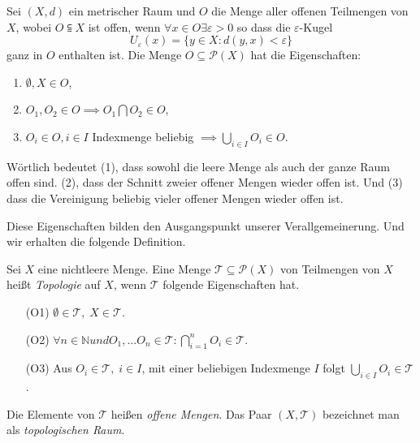 {
    Sei $(X,d)$ ein metrischer Raum und $O$ die Menge aller offenen Teilmengen von $X$,
    wobei $O \subseteqq X$ ist offen, wenn $\forall x \in O \exists \varepsilon > 0$ so dass die $\varepsilon$-Kugel
    $$
        U_\varepsilon(x) = \{ y \in X : d(y,x) < \varepsilon \}
    $$
    ganz in $O$ enthalten ist. 
    Die Menge $O \subseteq \mathcal{P}(X)$ hat die Eigenschaften:
    \begin{enumerate}
        \item $\emptyset, X \in O$,
        \item $O_1, O_2 \in O \implies O_1 \bigcap O_2 \in O$,
        \item $O_i \in O, i \in I$ Indexmenge beliebig $\implies \bigcup_{i \in I} O_i \in O$.
    \end{enumerate}
    Wörtlich bedeutet (1), dass sowohl die leere Menge als auch der ganze Raum
    offen sind. (2), dass der Schnitt zweier offener Mengen wieder offen ist.
    Und (3) dass die Vereinigung beliebig vieler offener Mengen wieder offen ist.
}

Diese Eigenschaften bilden den Ausgangspunkt unserer Verallgemeinerung. Und wir erhalten die folgende Definition.


{
    Sei $X$ eine nichtleere Menge. Eine Menge $\mathcal{T} \subseteq \mathcal{P}(X)$ von Teilmengen 
von $X$ heißt \emph{Topologie} auf $X$, wenn $\mathcal{T}$ folgende Eigenschaften hat.
\begin{itemize}
    \item[(O1)] $\emptyset \in \mathcal{T}, \; X \in \mathcal{T}$.
    \item[(O2)] $\forall n \in \mathbb{N} und O_1, \dots O_n \in \mathcal{T} : 
     \bigcap_{i=1}^{n} O_i \in \mathcal{T}$.
    \item[(O3)] Aus $O_i \in \mathcal{T}, \; i \in I$, mit einer beliebigen Indexmenge $I$ folgt 
    $\bigcup_{i \in I} O_i \in \mathcal{T}$.
\end{itemize}
Die Elemente von $\mathcal{T}$ heißen \emph{offene Mengen}. Das Paar $(X, \mathcal{T})$ 
bezeichnet man als \emph{topologischen Raum}.
}

